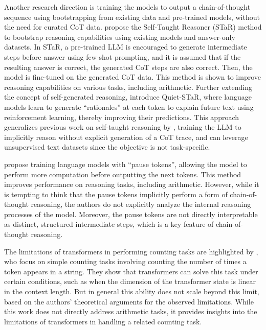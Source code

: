 Another research direction is training the models to output a chain-of-thought sequence using bootstrapping from existing data and pre-trained models, without the need for curated CoT data. \cite{zelikman_star_2022} propose the Self-Taught Reasoner (STaR) method to bootstrap reasoning capabilities using existing models and answer-only datasets. In STaR, a pre-trained LLM is encouraged to generate intermediate steps before answer using few-shot prompting, and it is assumed that if the resulting answer is correct, the generated CoT steps are also correct. Then, the model is fine-tuned on the generated CoT data. This method is shown to improve reasoning capabilities on various tasks, including arithmetic. Further extending the concept of self-generated reasoning, \cite{zelikman_quiet-star_2024} introduce Quiet-STaR, where language models learn to generate ``rationales'' at each token to explain future text using reinforcement learning, thereby improving their predictions. This approach generalizes previous work on self-taught reasoning by \cite{zelikman_star_2022}, training the LLM to implicitly reason without explicit generation of a CoT trace, and can leverage unsupervised text datasets since the objective is not task-specific.

\cite{goyal_think_2024} propose training language models with ``pause tokens'', allowing the model to perform more computation before outputting the next tokens. This method improves performance on reasoning tasks, including arithmetic. However, while it is tempting to think that the pause tokens implicitly perform a form of chain-of-thought reasoning, the authors do not explicitly analyze the internal reasoning processes of the model. Moreover, the pause tokens are not directly interpretable as distinct, structured intermediate steps, which is a key feature of chain-of-thought reasoning.

The limitations of transformers in performing counting tasks are highlighted by \cite{yehudai_when_2024}, who focus on simple counting tasks involving counting the number of times a token appears in a string. They show that transformers can solve this task under certain conditions, such as when the dimension of the transformer state is linear in the context length. But in general this ability does not scale beyond this limit, based on the authors' theoretical arguments for the observed limitations. While this work does not directly address arithmetic tasks, it provides insights into the limitations of transformers in handling a related counting task.

